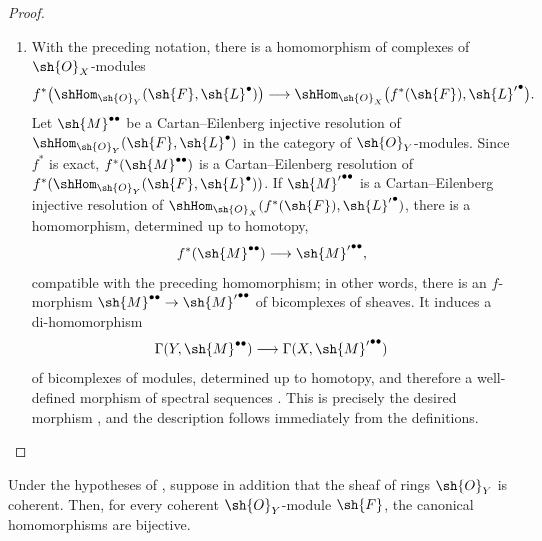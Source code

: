 \begin{proof}
\begin{enumerate}
  \item[\rm(ii)]
  With the preceding notation, there is a homomorphism of complexes of
  $\sh{O}_X$-modules
  \[
    f^*\bigl(\shHom_{\sh{O}_Y}(\sh{F},\sh{L}^\bullet)\bigr)
    \longrightarrow
    \shHom_{\sh{O}_X}
      \bigl(f^*(\sh{F}),{\sh{L}'}^\bullet\bigr).
  \]
  Let $\sh{M}^{\bullet\bullet}$ be a Cartan--Eilenberg injective
  resolution of
  $\shHom_{\sh{O}_Y}(\sh{F},\sh{L}^\bullet)$ in the category of
  $\sh{O}_Y$-modules.  Since $f^*$ is exact,
  $f^*(\sh{M}^{\bullet\bullet})$ is a Cartan--Eilenberg resolution of
  $f^*(\shHom_{\sh{O}_Y}(\sh{F},\sh{L}^\bullet))$.
  If ${\sh{M}'}^{\bullet\bullet}$ is a Cartan--Eilenberg injective
  resolution of
  $\shHom_{\sh{O}_X}(f^*(\sh{F}),{\sh{L}'}^\bullet)$, there is
   a homomorphism, determined up to homotopy,
  \[
    f^*(\sh{M}^{\bullet\bullet})
    \longrightarrow{\sh{M}'}^{\bullet\bullet},
  \]
  compatible with the preceding homomorphism; in other words, there
  is an $f$-morphism
  $\sh{M}^{\bullet\bullet}\to{\sh{M}'}^{\bullet\bullet}$ of
  bicomplexes of sheaves.
  It induces a di-homomorphism
  \[
    \Gamma(Y,\sh{M}^{\bullet\bullet})
    \longrightarrow\Gamma(X,{\sh{M}'}^{\bullet\bullet})
  \]
  of bicomplexes of modules, determined up to homotopy, and therefore
  a well-defined morphism of spectral sequences
  .  This is precisely the desired morphism
  , and the description
   follows immediately from the definitions.
\end{enumerate}
\end{proof}

\begin{proposition}[12.3.5]
\label{0.12.3.5}
Under the hypotheses of , suppose in addition that the
sheaf of rings $\sh{O}_Y$ is coherent.
Then, for every coherent $\sh{O}_Y$-module $\sh{F}$, the canonical
homomorphisms  are bijective.
\end{proposition}

